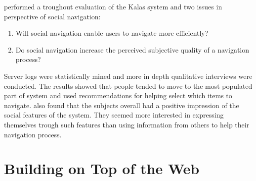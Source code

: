 \citet{svensson05} performed a troughout evaluation of the Kalas system and
two issues in perspective of social navigation:
\begin{enumerate}
  \item Will social navigation enable users to navigate more efficiently?
  \item Do social navigation increase the perceived subjective quality of
    a navigation process?
\end{enumerate}

Server logs were statistically mined and more in depth qualitative interviews
were conducted. The results showed that people tended to move to the most
populated part of system and used recommendations for helping select which
items to navigate. \citeauthor{svensson05} also found that the subjects
overall had a positive impression of the social features of the system. They
seemed more interested in expressing themselves trough such features than
using information from others to help their navigation process.

\section{Building on Top of the Web}

